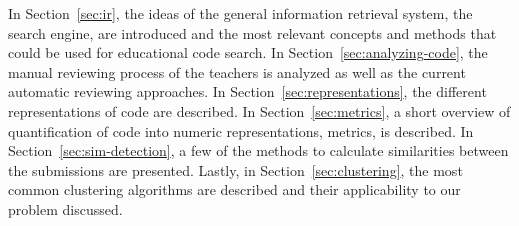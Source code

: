In Section~\ref{sec:ir}, the ideas of the general information retrieval system, the search engine, are introduced and the most relevant concepts and methods that could be used for educational code search. In Section~\ref{sec:analyzing-code}, the manual reviewing process of the teachers is analyzed as well as the current automatic reviewing approaches. In Section~\ref{sec:representations}, the different representations of code are described. In Section~\ref{sec:metrics}, a short overview of quantification of code into numeric representations, metrics, is described. In Section~\ref{sec:sim-detection}, a few of the methods to calculate similarities between the submissions are presented. Lastly, in Section~\ref{sec:clustering}, the most common clustering algorithms are described and their applicability to our problem discussed.
